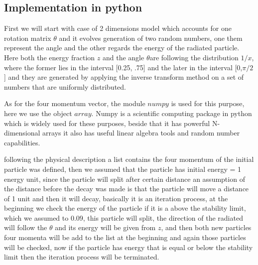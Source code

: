 \subsection{Implementation in python}
First we will start with case of 2 dimensions model which accounts for one rotation matrix $\theta$ and it evolves generation of two random numbers, one them represent the angle and the other regards the energy of the radiated particle. Here both the energy fraction $z$ and the angle $\theta$are following the distribution $1/x$, where the former lies in the interval [0.25, .75]
and the later in the interval [0,$\pi/2$] and they are generated by applying the inverse transform method on a set of numbers that are uniformly distributed.

As for the four momentum vector, the module $numpy$ is used for this purpose, here we use the object $array$. Numpy is a scientific computing package in python which is widely used for these purposes, beside that it has powerful N-dimensional arrays it also has useful linear algebra tools and random number capabilities.         

following the physical description a list contains the four momentum of the initial particle was defined, then we assumed that the particle has initial energy = 1 energy unit, since the particle will split after certain distance an assumption of the distance before the decay was made is that the particle will move a distance of 1 unit and then it will decay, basically it is an iteration process,  at the beginning we check the energy of the particle if it is a above the stability limit, which we assumed to $0.09$, this particle will split, the direction of the radiated will follow the $\theta$ and its energy will be given from $z$, and then both new particles four momenta will be add to the list at the beginning and again those particles will be checked, now if the particle has energy that is equal or below the stability limit then the iteration process will be terminated.   

